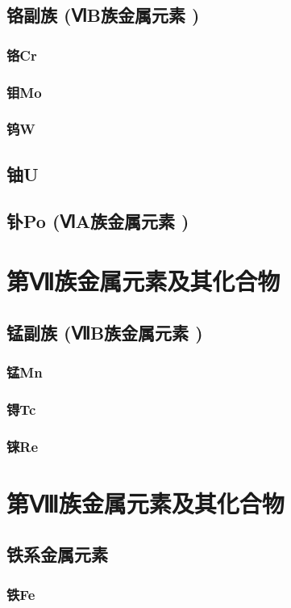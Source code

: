 \documentclass[UTF8]{../03-Chemistry}
\begin{document}
    \subsection{铬副族 (ⅥB族金属元素 )}
        \subsubsection{铬Cr}
        \subsubsection{钼Mo}
        \subsubsection{钨W}
    \subsection{铀U}
    \subsection{钋Po (ⅥA族金属元素 )}
\section{第Ⅶ族金属元素及其化合物}
    \subsection{锰副族 (ⅦB族金属元素 )}
        \subsubsection{锰Mn}
        \subsubsection{锝Tc}
        \subsubsection{铼Re}
\section{第Ⅷ族金属元素及其化合物}
    \subsection{铁系金属元素}
        \subsubsection{铁Fe}
\end{document}

